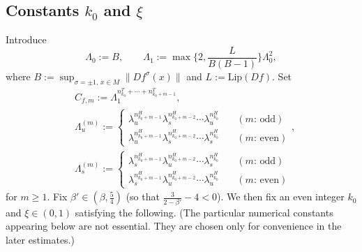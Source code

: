 \documentclass{amsart}
\theoremstyle{plain}
\theoremstyle{definition}
\theoremstyle{remark}
\numberwithin{equation}{section}
\begin{document}
\subsection{Constants $k_0$ and $\xi$}\label{ss:k0}

Introduce
\[
    \Lambda_0 :=     B,
    \qquad \Lambda_1 := \max\Big\{2,\frac{L}{B(B-1)}\Big\}
    \Lambda_0^2,
\]
 where $B:=\sup_{\sigma=\pm1,\,x\in M}\|Df^{\sigma}(x)\|$ and $L:=\mathrm{Lip}(Df)$.
 Set
\begin{align*}
&C_{f,m}:=\Lambda_1^{n_{k_0}^T+\cdots+n_{k_0+m-1}^T},\\
&\Lambda_{u}^{(m)}:=
\begin{cases}
\lambda_{u}^{n_{k_0+m-1}^H}\lambda_{s}^{n_{k_0+m-2}^H}\cdots \lambda_{u}^{n_{k_0}^H} \quad &(\text{$m$: odd})\\
\lambda_{u}^{n_{k_0+m-1}^H}\lambda_{s}^{n_{k_0+m-2}^H}\cdots \lambda_{s}^{n_{k_0}^H}\quad &(\text{$m$: even})
\end{cases},\\
&\Lambda_{s}^{(m)}:=
\begin{cases}
\lambda_{s}^{n_{k_0+m-1}^H}\lambda_{u}^{n_{k_0+m-2}^H}\cdots \lambda_{s}^{n_{k_0}^H} \quad &(\text{$m$: odd})\\
\lambda_{s}^{n_{k_0+m-1}^H}\lambda_{u}^{n_{k_0+m-2}^H}\cdots \lambda_{u}^{n_{k_0}^H}\quad &(\text{$m$: even})
\end{cases}
\end{align*}
for $m\ge 1$.
Fix $\beta' \in(\beta,\frac{5}{4})$ (so that $\frac{3}{2-\beta'}-4<0$).
We then fix an even integer $k_0$ and $\xi\in(0,1)$ satisfying the following.
(The particular numerical constants appearing below are not essential. They are chosen only for convenience in the later estimates.)
\end{document}
